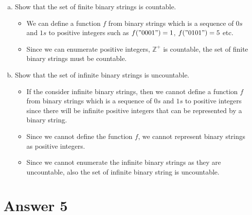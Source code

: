 \documentclass[11pt]{article}
\begin{document}
\begin{enumerate}[a)]
    \item
        Show that the set of finite binary strings is countable.
        
        \begin{itemize}
            \item We can define a function $f$ from binary strings which is a sequence of $0s$ and $1s$ to positive integers such as $f("0001") = 1$, $f("0101") = 5$ etc.
            \item Since we can enumerate positive integers, $\mathbb{Z}^{+}$ is countable, the set of finite binary strings must be countable.
        \end{itemize}{}
    \item
        Show that the set of infinite binary strings is uncountable.
        \begin{itemize}
            \item If the consider infinite binary strings, then we cannot define a function $f$ from binary strings which is a sequence of $0s$ and $1s$ to positive integers since there will be infinite positive integers that can be represented by a binary string.
            \item Since we cannot define the function $f$, we cannot represent binary strings as positive integers.
            \item Since we cannot enumerate the infinite binary strings as they are uncountable, also the set of infinite binary string is uncountable.
        \end{itemize}{}
\end{enumerate}{}

\pagebreak

\section*{Answer 5}
\end{document}
